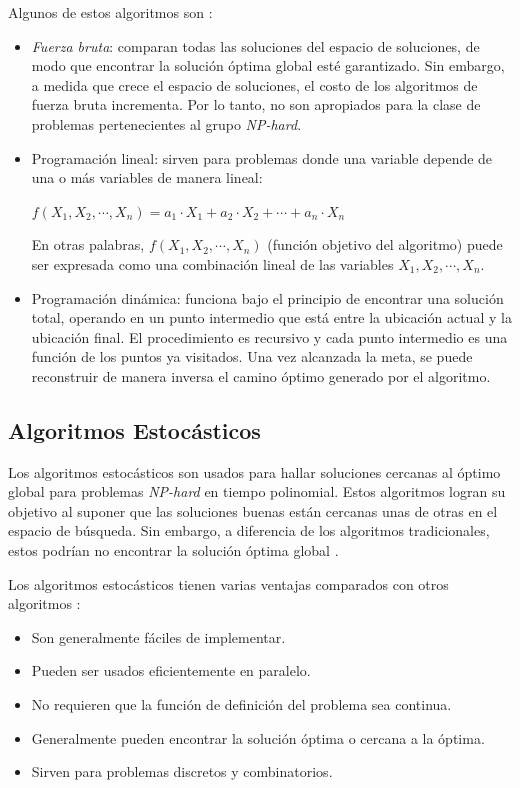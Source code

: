     Algunos de estos algoritmos son \cite{TA_1}:
\begin{itemize}
    \item \emph{Fuerza bruta}: comparan todas las soluciones del espacio de
soluciones, de modo que encontrar la solución óptima global esté garantizado. Sin
embargo, a medida que crece el espacio de soluciones, el costo de los algoritmos
de fuerza bruta incrementa. Por lo tanto, no son apropiados para la clase de
problemas pertenecientes al grupo \emph{NP-hard}.
    \item Programación lineal: sirven para problemas donde una variable depende
de una o más variables de manera lineal:
\begin{center}
    $f(X_1, X_2, \cdots, X_n) = a_1 \cdot X_1 + a_2 \cdot X_2 + \cdots + a_n \cdot X_n$
\end{center}

En otras palabras, $f(X_1, X_2, \cdots, X_n)$ (función objetivo del algoritmo)
puede ser expresada como una combinación lineal de las variables
$X_1, X_2, \cdots, X_n$. 
    \item Programación dinámica: funciona bajo el principio de encontrar una
solución total, operando en un punto intermedio que está entre la ubicación actual
y la ubicación final. El procedimiento es recursivo y cada punto intermedio es una
función de los puntos ya visitados. Una vez alcanzada la meta, se puede reconstruir
de manera inversa el camino óptimo generado por el algoritmo.
\end{itemize}

\subsection{Algoritmos Estocásticos}

Los algoritmos estocásticos son usados para hallar soluciones
cercanas al óptimo global para pro\-ble\-mas \emph{NP-hard} en tiempo polinomial. Estos
algoritmos logran su objetivo al suponer que las soluciones buenas están
cercanas unas de otras en el espacio de búsqueda. Sin embargo, a diferencia de
los algoritmos tradicionales, estos podrían no encontrar la solución óptima
global \cite{PSO_0}.

Los algoritmos estocásticos tienen varias ventajas comparados con otros
algoritmos \cite{SA_1}:
\begin{itemize}
    \item Son generalmente fáciles de implementar.
    \item Pueden ser usados eficientemente en paralelo.
    \item No requieren que la función de definición del problema sea continua.
    \item Generalmente pueden encontrar la solución óptima o cercana a la
óptima.
    \item Sirven para problemas discretos y combinatorios.
\end{itemize}

